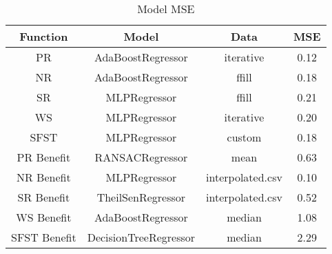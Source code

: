 \begin{table}
\centering
\begin{tabular}{|c|c|c|c|}
\hline
\textbf{Function} & \textbf{Model} & \textbf{Data} & \textbf{MSE} \\
\hline
PR & AdaBoostRegressor & iterative & 0.12 \\
\hline
NR & AdaBoostRegressor & ffill & 0.18 \\
\hline
SR & MLPRegressor & ffill & 0.21 \\
\hline
WS & MLPRegressor & iterative & 0.20 \\
\hline
SFST & MLPRegressor & custom & 0.18 \\
\hline
PR Benefit & RANSACRegressor & mean & 0.63 \\
\hline
NR Benefit & MLPRegressor & interpolated.csv & 0.10 \\
\hline
SR Benefit & TheilSenRegressor & interpolated.csv & 0.52 \\
\hline
WS Benefit & AdaBoostRegressor & median & 1.08 \\
\hline
SFST Benefit & DecisionTreeRegressor & median & 2.29 \\
\hline
\end{tabular}
\caption{Model MSE}
\label{tab_specxtra:model_reg_specific_best}
\end{table}
